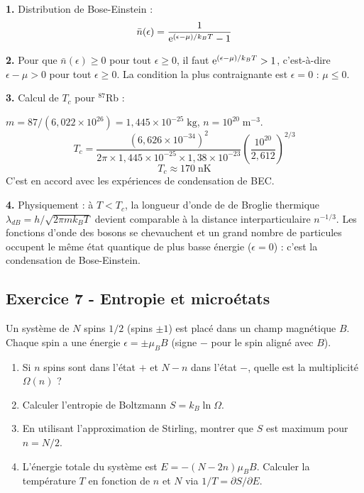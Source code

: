 \documentclass[12pt,a4paper]{article}
\begin{document}
\begin{boitecorrige}
\textbf{1.} Distribution de Bose-Einstein :
\[
\bar{n}(\epsilon) = \frac{1}{\mathrm{e}^{(\epsilon-\mu)/k_BT} - 1}
\]

\textbf{2.} Pour que $\bar{n}(\epsilon) \geq 0$ pour tout $\epsilon \geq 0$, il faut $\mathrm{e}^{(\epsilon-\mu)/k_BT} > 1$, c'est-à-dire $\epsilon - \mu > 0$ pour tout $\epsilon \geq 0$. La condition la plus contraignante est $\epsilon = 0$ : $\mu \leq 0$.

\textbf{3.} Calcul de $T_c$ pour ${}^{87}$Rb :

$m = 87/(6{,}022\times10^{26}) = 1{,}445\times10^{-25}\;\text{kg}$, $n = 10^{20}\;\text{m}^{-3}$.
\[
T_c = \frac{(6{,}626\times10^{-34})^2}{2\pi\times1{,}445\times10^{-25}\times1{,}38\times10^{-23}}\left(\frac{10^{20}}{2{,}612}\right)^{2/3}
\]
\[
T_c \approx 170\;\text{nK}
\]
C'est en accord avec les expériences de condensation de BEC.

\textbf{4.} Physiquement : à $T < T_c$, la longueur d'onde de de Broglie thermique $\lambda_{dB} = h/\sqrt{2\pi mk_BT}$ devient comparable à la distance interparticulaire $n^{-1/3}$. Les fonctions d'onde des bosons se chevauchent et un grand nombre de particules occupent le même état quantique de plus basse énergie ($\epsilon=0$) : c'est la condensation de Bose-Einstein.
\end{boitecorrige}

\subsection*{Exercice 7 - Entropie et microétats \niveau{\moyen}}

\begin{boiteexercice}
Un système de $N$ spins $1/2$ (spins $\pm1$) est placé dans un champ magnétique $B$. Chaque spin a une énergie $\epsilon = \pm\mu_B B$ (signe $-$ pour le spin aligné avec $B$).
\begin{enumerate}
  \item Si $n$ spins sont dans l'état $+$ et $N-n$ dans l'état $-$, quelle est la multiplicité $\Omega(n)$ ?
  \item Calculer l'entropie de Boltzmann $S = k_B\ln\Omega$.
  \item En utilisant l'approximation de Stirling, montrer que $S$ est maximum pour $n = N/2$.
  \item L'énergie totale du système est $E = -(N-2n)\mu_B B$. Calculer la température $T$ en fonction de $n$ et $N$ via $1/T = \partial S/\partial E$.
\end{enumerate}
\end{boiteexercice}
\end{document}
